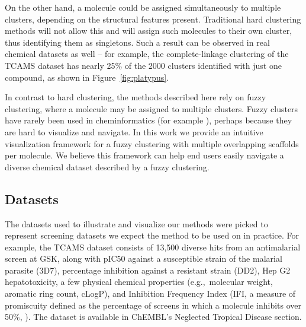 \documentclass[journal=jacsat,biochem,manuscript=article]{achemso}
\newcommand*\fref[1]{Figure~\ref{fig:#1}}
\newcommand*\eg{e.g.,~}
\begin{document}
On the other hand, a molecule could be assigned simultaneously to multiple clusters, depending on the structural features present. Traditional
hard clustering methods will not allow this and will assign such molecules
to their own cluster, thus identifying them
as singletons.  Such a result can be observed in real chemical datasets
as well -- for example, the complete-linkage clustering of the TCAMS
dataset\cite{Gamo2010,Calderon2011} has nearly 25\% of the 2000
clusters identified with just one compound, as shown in \fref{platypus}.


In contrast to hard clustering, the methods described
here rely on fuzzy clustering, where a molecule may be assigned to
multiple clusters. Fuzzy clusters have rarely been used in
cheminformatics (for example \cite{Holliday2004,Richmond2013Galois}),
perhaps because they are hard to visualize and navigate.  In this work
we provide an intuitive visualization framework for a fuzzy clustering with
multiple overlapping scaffolds per molecule. We believe this framework can help end
users easily navigate a diverse chemical dataset described by a fuzzy clustering.


\subsection{Datasets}
\label{sec:datasets}
The datasets used to illustrate and visualize our methods were picked
to represent screening datasets we expect the method to
be used on in practice. For example, the TCAMS dataset\cite{Gamo2010}
consists of 13,500 diverse hits from an antimalarial screen at GSK,
along with pIC50 against a susceptible strain of the malarial parasite
(3D7), percentage inhibition against a resistant strain (DD2), Hep G2
hepatotoxicity, a few physical chemical properties (\eg molecular
weight, aromatic ring count, cLogP), and Inhibition Frequency Index
(IFI, a measure of promiscuity defined as the percentage of screens in
which a molecule inhibits over 50\%, \cite{Chakravorty2013IFI}). The dataset is available in Ch{EMBL}'s Neglected Tropical Disease section\cite{ChEMBLNTD}.
\end{document}
